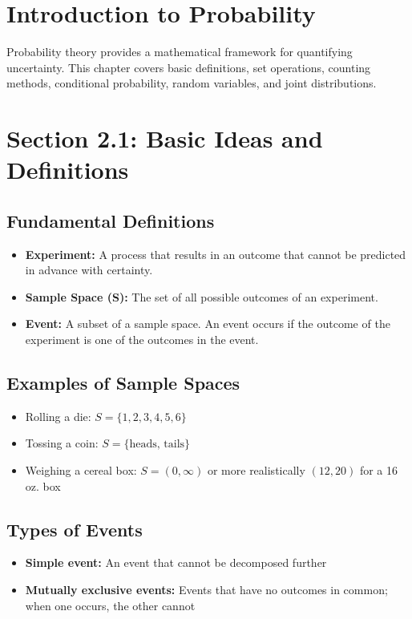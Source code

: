 \documentclass[11pt]{article}
\begin{document}
\section*{Introduction to Probability}
Probability theory provides a mathematical framework for quantifying uncertainty. This chapter covers basic definitions, set operations, counting methods, conditional probability, random variables, and joint distributions.

\section*{Section 2.1: Basic Ideas and Definitions}
\subsection*{Fundamental Definitions}
\begin{itemize}[nosep]
    \item \textbf{Experiment:} A process that results in an outcome that cannot be predicted in advance with certainty.
    \item \textbf{Sample Space (S):} The set of all possible outcomes of an experiment.
    \item \textbf{Event:} A subset of a sample space. An event occurs if the outcome of the experiment is one of the outcomes in the event.
\end{itemize}

\subsection*{Examples of Sample Spaces}
\begin{itemize}[nosep]
    \item Rolling a die: \(S = \{1, 2, 3, 4, 5, 6\}\)
    \item Tossing a coin: \(S = \{\text{heads, tails}\}\)
    \item Weighing a cereal box: \(S = (0, \infty)\) or more realistically \((12, 20)\) for a 16 oz. box
\end{itemize}

\subsection*{Types of Events}
\begin{itemize}[nosep]
    \item \textbf{Simple event:} An event that cannot be decomposed further
    \item \textbf{Mutually exclusive events:} Events that have no outcomes in common; when one occurs, the other cannot
\end{itemize}
\end{document}

